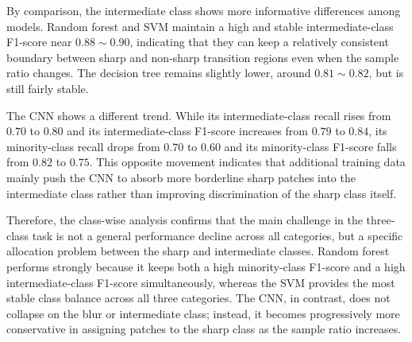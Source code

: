 \par By comparison, the intermediate class shows more informative differences
among models. Random forest and SVM maintain a high and stable
intermediate-class F1-score near $0.88\sim0.90$, indicating that they can keep
a relatively consistent boundary between sharp and non-sharp transition regions
even when the sample ratio changes. The decision tree remains slightly lower,
around $0.81\sim0.82$, but is still fairly stable.

\par The CNN shows a different trend. While its intermediate-class recall rises
from $0.70$ to $0.80$ and its intermediate-class F1-score increases from $0.79$
to $0.84$, its minority-class recall drops from $0.70$ to $0.60$ and its
minority-class F1-score falls from $0.82$ to $0.75$. This opposite movement
indicates that additional training data mainly push the CNN to absorb more
borderline sharp patches into the intermediate class rather than improving
discrimination of the sharp class itself.

\par Therefore, the class-wise analysis confirms that the main challenge in the
three-class task is not a general performance decline across all categories,
but a specific allocation problem between the sharp and intermediate classes.
Random forest performs strongly because it keeps both a high minority-class
F1-score and a high intermediate-class F1-score simultaneously, whereas the
SVM provides the most stable class balance across all three categories. The
CNN, in contrast, does not collapse on the blur or intermediate class; instead,
it becomes progressively more conservative in assigning patches to the sharp
class as the sample ratio increases.


